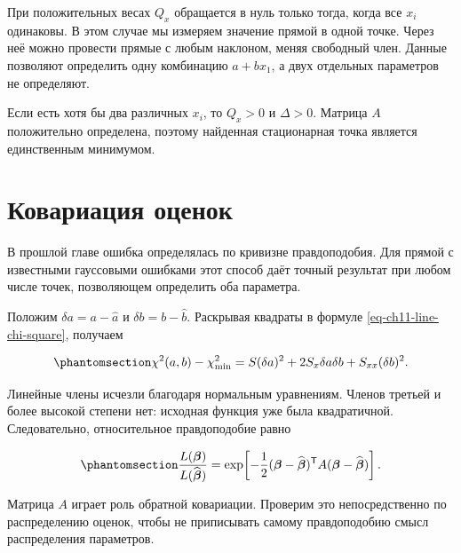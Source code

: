 \documentclass[
  russian,
  11pt,
  a4paper,
  open=any]{scrbook}
\begin{document}
При положительных весах \(Q_x\) обращается в нуль только тогда, когда
все \(x_i\) одинаковы. В этом случае мы измеряем значение прямой в одной
точке. Через неё можно провести прямые с любым наклоном, меняя свободный
член. Данные позволяют определить одну комбинацию \(a+bx_1\), а двух
отдельных параметров не определяют.

Если есть хотя бы два различных \(x_i\), то \(Q_x>0\) и \(\Delta>0\).
Матрица \(A\) положительно определена, поэтому найденная стационарная
точка является единственным минимумом.

\section{Ковариация
оценок}\label{ux43aux43eux432ux430ux440ux438ux430ux446ux438ux44f-ux43eux446ux435ux43dux43eux43a}

В прошлой главе ошибка определялась по кривизне правдоподобия. Для
прямой с известными гауссовыми ошибками этот способ даёт точный
результат при любом числе точек, позволяющем определить оба параметра.

Положим \(\delta a=a-\widehat a\) и \(\delta b=b-\widehat b\). Раскрывая
квадраты в формуле \ref{eq-ch11-line-chi-square}, получаем

\begin{equation}\protect\phantomsection\label{eq-ch11-exact-quadratic-form}{
\chi^2(a,b)-\chi^2_{\min}
=S(\delta a)^2+2S_x\delta a\delta b+S_{xx}(\delta b)^2.
}\end{equation}

Линейные члены исчезли благодаря нормальным уравнениям. Членов третьей и
более высокой степени нет: исходная функция уже была квадратичной.
Следовательно, относительное правдоподобие равно

\begin{equation}\protect\phantomsection\label{eq-ch11-line-relative-likelihood}{
\frac{L(\boldsymbol\beta)}{L(\widehat{\boldsymbol\beta})}
=\exp\!\left[-\frac12
(\boldsymbol\beta-\widehat{\boldsymbol\beta})^{\mathsf T}
A(\boldsymbol\beta-\widehat{\boldsymbol\beta})\right].
}\end{equation}

Матрица \(A\) играет роль обратной ковариации. Проверим это
непосредственно по распределению оценок, чтобы не приписывать самому
правдоподобию смысл распределения параметров.
\end{document}
